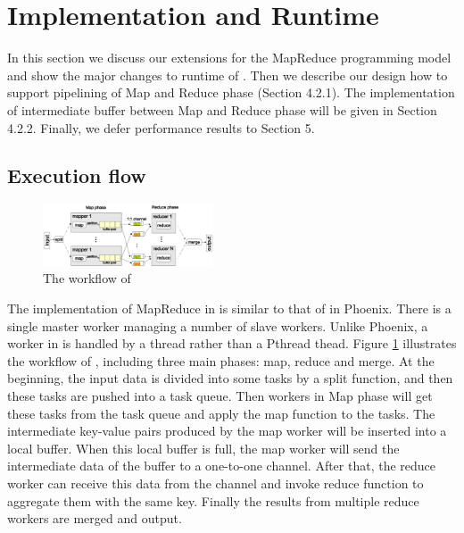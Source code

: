 \section{Implementation and Runtime}
In this section we discuss our extensions for the MapReduce programming model and show the major changes to runtime of \myds. 
Then we describe our design how to support pipelining of Map and Reduce phase (Section 4.2.1).
The implementation of intermediate buffer between Map and Reduce phase will be given in Section 4.2.2.
Finally, we defer performance results to Section 5.



\subsection{Execution flow}
\begin{figure}[!h!t]  
    \centering
    \includegraphics[width=0.45\textwidth]{eps/dmr_workflow.eps}
    \caption{The workflow of \myds}
    \label{fig:dmr:workflow}
\end{figure}

The implementation of MapReduce in  \myds is similar to that of in Phoenix. 
There is a single master worker managing a number of slave workers. Unlike Phoenix,  a worker in \myds is handled by a \myth thread rather than a Pthread thead.
Figure \ref{fig:dmr:workflow} illustrates the workflow of \myds, including three main phases: map, reduce and merge. 
At the beginning,  the input data is divided into some tasks by a split function, and then these tasks are pushed  into a task queue. 
Then workers in Map phase will get these tasks from the task queue and apply the map function to the tasks.
The intermediate key-value pairs produced by the map worker will be inserted into a local buffer.
When this local buffer is full, the map worker will send the intermediate data of the buffer to a one-to-one channel.
After that, the reduce worker can receive this data from the channel and invoke reduce function to aggregate them with the same key.  
Finally the results from multiple reduce workers are merged and output.

